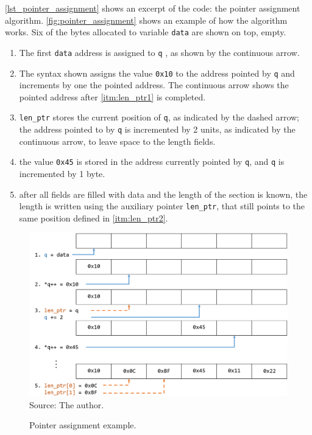 \documentclass[
	12pt,				%
	openright,			%
	twoside,			%
	a4paper,			%
	brazil,
	french,				%
	english
	]{abntex2}
\begin{document}
\autoref{lst_pointer_assignment} shows an excerpt of the code: the pointer assignment algorithm. \autoref{fig:pointer_assignment} shows an example of how the  algorithm works. Six of the bytes allocated to variable \texttt{data} are shown on top, empty.
\begin{enumerate}
\item The first \texttt{data} address is assigned to \texttt{q} , as shown by the continuous arrow.
\item \label{itm:len_ptr1} The syntax shown assigns the value \texttt{0x10} to the address pointed by \texttt{q} and increments by one the pointed address. The continuous arrow shows the pointed address after \autoref{itm:len_ptr1} is completed.
\item \label{itm:len_ptr2} \texttt{len\_ptr} stores the current position of \texttt{q}, as indicated by the dashed arrow; the address pointed to by \texttt{q} is incremented by 2 units, as indicated by the continuous arrow, to leave space to the length fields.
\item the value \texttt{0x45} is stored in the address currently pointed by \texttt{q}, and \texttt{q} is incremented by 1 byte.
\item after all fields are filled with data and the length of the section is known, the length is written using the auxiliary pointer \texttt{len\_ptr}, that still points to the same position defined in \autoref{itm:len_ptr2}.
\end{enumerate}

\begin{figure}[!h]
\centering
\caption{Pointer assignment example.}
\includegraphics[width=1\linewidth]{figuras/pointer_assignment.png}
\\Source: The author.
\label{fig:pointer_assignment}
\end{figure}
\end{document}
